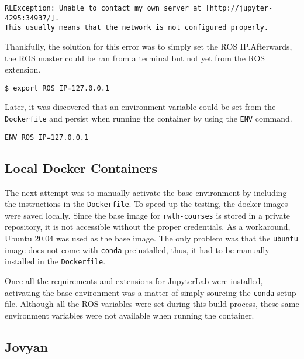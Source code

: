     \begin{lstlisting}[language=error]
RLException: Unable to contact my own server at [http://jupyter-4295:34937/].
This usually means that the network is not configured properly.        
    \end{lstlisting}

    \noindent Thankfully, the solution for this error was to simply set the ROS IP.\@  Afterwards, the ROS master could be ran from a terminal but not yet from the ROS extension.

    \begin{lstlisting}[language=console]
$ export ROS_IP=127.0.0.1
    \end{lstlisting}

    \noindent Later, it was discovered that an environment variable could be set from the \texttt{Dockerfile} and persist when running the container by using the \texttt{ENV} command.

    \begin{lstlisting}[language=docker]
ENV ROS_IP=127.0.0.1
    \end{lstlisting}


    \subsection{Local Docker Containers}

    The next attempt was to manually activate the base environment by including the instructions in the \texttt{Dockerfile}. To speed up the testing, the docker images were saved locally. Since the base image for \texttt{rwth-courses} is stored in a private repository, it is not accessible without the proper credentials. As a workaround, Ubuntu 20.04 was used as the base image. The only problem was that the \texttt{ubuntu} image does not come with \texttt{conda} preinstalled, thus, it had to be manually installed in the \texttt{Dockerfile}. 
    
    Once all the requirements and extensions for JupyterLab were installed, activating the base environment was a matter of simply sourcing the \texttt{conda} setup file. Although all the ROS variables were set during this build process, these same environment variables were not available when running the container. 

    \subsection{Jovyan}
    
